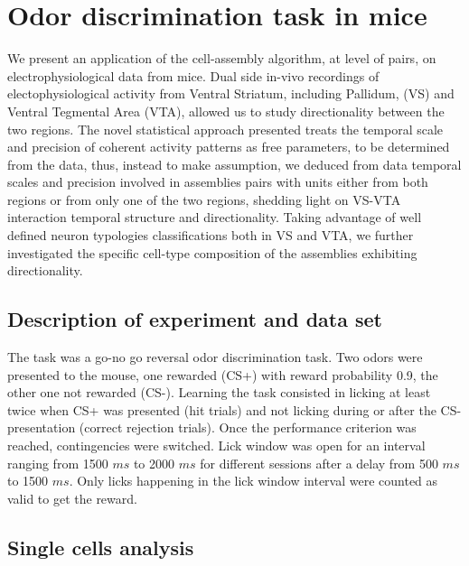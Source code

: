 \chapter{Odor discrimination task in mice}
\label{chap:MaxData}
We present an application of the cell-assembly algorithm, at level of pairs, on electrophysiological data from mice.
Dual side in-vivo recordings of electophysiological activity from Ventral Striatum, including Pallidum, (VS) and Ventral Tegmental Area (VTA), allowed us to study directionality between the two regions.
The novel statistical approach presented treats the temporal scale and precision of coherent activity patterns as free parameters, to be determined from the data, thus, instead to make assumption, we deduced from data temporal scales and precision involved in assemblies pairs with units either from both regions or from only one of the two regions, shedding light on VS-VTA interaction temporal structure and directionality.
Taking advantage of well defined neuron typologies classifications both in VS and VTA, we further investigated the specific cell-type composition of the assemblies exhibiting directionality. 
\section{Description of experiment and data set}
The task was a go-no go reversal odor discrimination task. Two odors were presented to the mouse, one rewarded (CS+) with reward probability 0.9, the other one not rewarded (CS-). Learning the task consisted in licking at least twice when CS+ was presented (hit trials) and not licking during or after the CS- presentation (correct rejection trials). Once the performance criterion was reached, contingencies were switched. Lick window was open for an interval ranging from 1500 $ms$ to 2000 $ms$ for different sessions after a delay from 500 $ms$ to 1500 $ms$. Only licks happening in the lick window interval were counted as valid to get the reward.
\section{Single cells analysis}
